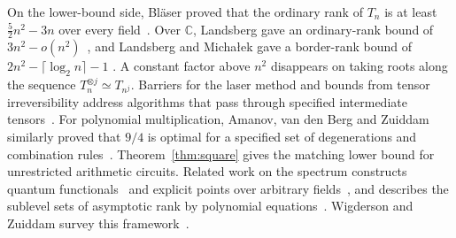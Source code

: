 On the lower-bound side, Bl\"aser proved that the ordinary rank of $T_n$
is at least $\tfrac52 n^2-3n$ over every field~\cite{Blaeser}.
Over $\mathbb C$, Landsberg gave an ordinary-rank bound of
$3n^2-o(n^2)$~\cite{LandsbergRank}, and Landsberg and Micha{\l}ek
gave a border-rank bound of $2n^2-\lceil\log_2 n\rceil-1$
\cite{LandsbergMichalek}. A constant factor above $n^2$ disappears on
taking roots along the sequence $T_n^{\otimes j}\simeq T_{n^j}$.
Barriers for the laser method and bounds from tensor irreversibility
address algorithms that pass through specified intermediate
tensors~\cite{limits,irreversible}. For polynomial multiplication,
Amanov, van den Berg and Zuiddam similarly proved that $9/4$ is optimal
for a specified set of degenerations and combination
rules~\cite[Theorem~5.4]{abvz}. Theorem~\ref{thm:square} gives the
matching lower bound for unrestricted arithmetic circuits. Related
work on the spectrum constructs quantum functionals~\cite{CVZ} and
explicit points over arbitrary fields~\cite{almanlipratt}, and describes
the sublevel sets of asymptotic rank by polynomial
equations~\cite{SpectralSublevels}. Wigderson and Zuiddam survey this
framework~\cite{WZ}.
